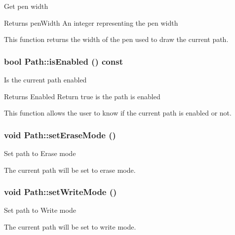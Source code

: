 \label{classPath_a148b0baa2335d7e6f8a8d608c4ed5be7}
Get pen width \begin{DoxyReturn}{Returns}
penWidth An integer representing the pen width
\end{DoxyReturn}
This function returns the width of the pen used to draw the current path. \hypertarget{classPath_a5ea27f57363b51a7f6b6d90dc2d424bb}{
\subsubsection[{isEnabled}]{\setlength{\rightskip}{0pt plus 5cm}bool Path::isEnabled () const}}
\label{classPath_a5ea27f57363b51a7f6b6d90dc2d424bb}
Is the current path enabled

\begin{DoxyReturn}{Returns}
Enabled Return true is the path is enabled
\end{DoxyReturn}
This function allows the user to know if the current path is enabled or not. \hypertarget{classPath_a20a988490d9fbf277de8b7c773be9925}{
\subsubsection[{setEraseMode}]{\setlength{\rightskip}{0pt plus 5cm}void Path::setEraseMode ()}}
\label{classPath_a20a988490d9fbf277de8b7c773be9925}
Set path to Erase mode

The current path will be set to erase mode. \hypertarget{classPath_a0c95b3ec75c14f0683db1a3894240ad7}{
\subsubsection[{setWriteMode}]{\setlength{\rightskip}{0pt plus 5cm}void Path::setWriteMode ()}}
\label{classPath_a0c95b3ec75c14f0683db1a3894240ad7}
Set path to Write mode

The current path will be set to write mode. 

